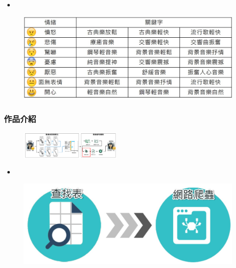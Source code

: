 \documentclass[10pt, conference, compsocconf]{beamer}
\begin{document}
\begin{CJK}{UTF8}{}
\begin{frame}
\begin{itemize}
\item {}
\end{itemize}

\begin{figure}[!t]
\begin{center}
\includegraphics[width=12cm]{./Figures/504.jpg}
\end{center}
\end{figure}
\end{frame}

\begin{frame}
\frametitle{作品介紹}

\vspace{-5mm}
\begin{figure}[t]
\begin{flushright}
\includegraphics[width=5cm]{./Figures/framework6.pdf}
\end{flushright}
\end{figure}

\vspace{-5mm}

\begin{itemize}
\item {}
\end{itemize}

\begin{figure}[!t]
\begin{center}
\includegraphics[width=12cm]{./Figures/506.jpg}
\end{center}
\end{figure}
\end{frame}


\end{CJK}
\end{document}
